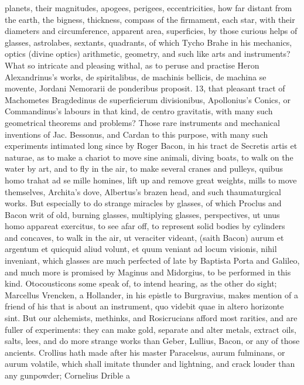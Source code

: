 {planets, their magnitudes, apogees, perigees, eccentricities, how far
distant from the earth, the bigness, thickness, compass of the
firmament, each star, with their diameters and circumference, apparent
area, superficies, by those curious helps of glasses, astrolabes,
sextants, quadrants, of which Tycho Brahe in his mechanics, optics
(divine optics) arithmetic, geometry, and such like arts and
instruments? What so intricate and pleasing withal, as to peruse and
practise Heron Alexandrinus's works, de spiritalibus, de machinis
bellicis, de machina se movente, Jordani Nemorarii de ponderibus
proposit. 13, that pleasant tract of Machometes Bragdedinus de
superficierum divisionibus, Apollonius's Conics, or Commandinus's
labours in that kind, de centro gravitatis, with many such geometrical
theorems and problems? Those rare instruments and mechanical inventions
of Jac. Bessonus, and Cardan to this purpose, with many such
experiments intimated long since by Roger Bacon, in his tract de
Secretis artis et naturae, as to make a chariot to move sine
animali, diving boats, to walk on the water by art, and to fly in the
air, to make several cranes and pulleys, quibus homo trahat ad se mille
homines, lift up and remove great weights, mills to move themselves,
Archita's dove, Albertus's brazen head, and such thaumaturgical works.
But especially to do strange miracles by glasses, of which Proclus and
Bacon writ of old, burning glasses, multiplying glasses, perspectives,
ut unus homo appareat exercitus, to see afar off, to represent solid
bodies by cylinders and concaves, to walk in the air, ut veraciter
videant, (saith Bacon) aurum et argentum et quicquid aliud volunt, et
quum veniant ad locum visionis, nihil inveniant, which glasses are much
perfected of late by Baptista Porta and Galileo, and much more is
promised by Maginus and Midorgius, to be performed in this kind.
Otocousticons some speak of, to intend hearing, as the other do sight;
Marcellus Vrencken, a Hollander, in his epistle to Burgravius, makes
mention of a friend of his that is about an instrument, quo videbit
quae in altero horizonte sint. But our alchemists, methinks, and
Rosicrucians afford most rarities, and are fuller of experiments: they
can make gold, separate and alter metals, extract oils, salts, lees,
and do more strange works than Geber, Lullius, Bacon, or any of those
ancients. Crollius hath made after his master Paracelsus, aurum
fulminans, or aurum volatile, which shall imitate thunder and
lightning, and crack louder than any gunpowder; Cornelius Drible a
}
